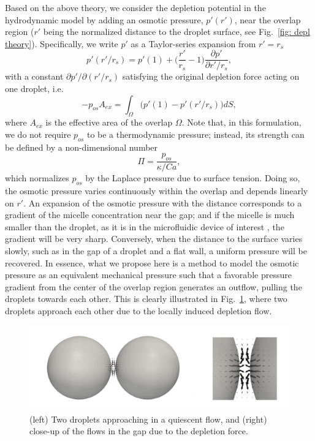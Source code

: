 Based on the above theory, we consider the depletion potential in the hydrodynamic model by adding an osmotic pressure, $p'(r')$, near the overlap region ($r'$ being the normalized distance to the droplet surface, see Fig.\ \ref{fig: depl theory}). Specifically, we write $p'$ as a Taylor-series expansion from $r'=r_s$
\begin{equation}
    p'(r'/r_s) = p'(1) + \bigg(\frac{r'}{r_s}-1 \bigg) \frac{\partial{p'}}{\partial{r'/r_s}},
    \label{pot P linear}
\end{equation}
with a constant $\partial{p'}/\partial{(r'/r_s)}$ satisfying the original depletion force acting on one droplet, i.e.
\begin{equation}
    -p_{os}A_{ex} = \int_\Omega \big(p'(1) - p'(r'/r_s)\big)dS,
    \label{pot P balance}
\end{equation}
where $A_{ex}$ is the effective area of the overlap $\Omega$. Note that, in this formulation, we do not require $p_{os}$ to be a thermodynamic pressure; instead, its strength can be defined by a non-dimensional number
\begin{equation}
    \Pi = \frac{p_{os}}{\kappa /Ca},
    \label{Pi}
\end{equation}
which normalizes $p_{os}$ by the Laplace pressure due to surface tension. Doing so, the osmotic pressure varies continuously within the overlap and depends linearly on $r'$. An expansion of the osmotic pressure with the distance corresponds to a gradient of the micelle concentration near the gap; and if the micelle is much smaller than the droplet, as it is in the microfluidic device of interest \citep{Shen_2016AS}, the gradient will be very sharp. Conversely, when the distance to the surface varies slowly, such as in the gap of a  droplet and a flat wall, a uniform pressure will be recovered. In essence, what we propose here is a method to model the osmotic pressure as an equivalent mechanical pressure such that a favorable pressure gradient from the center of the overlap region generates an outflow, pulling the droplets towards each other. This is clearly illustrated in Fig.\ \ref{fig: depl flow}, where two droplets approach each other due to the locally induced depletion flow.

\begin{figure}[t]
 \centering
 \includegraphics[width=0.9\columnwidth]{figs/depletion_flow.png}
 \caption{(left) Two droplets approaching in a quiescent flow, and (right) close-up of the flows in the gap due to the depletion force.}
 \label{fig: depl flow}
\end{figure}

